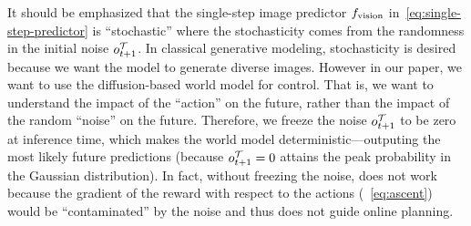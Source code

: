 \begin{remark}
    It should be emphasized that the single-step image predictor $f_{\text{vision}}$ in~\eqref{eq:single-step-predictor} is ``stochastic'' where the stochasticity comes from the randomness in the initial noise $o_{t+1}^{{\cal T}}$. In classical generative modeling, stochasticity is desired because we want the model to generate diverse images. However in our paper, we want to use the diffusion-based world model for control. That is, we want to understand the impact of the ``action'' on the future, rather than the impact of the random ``noise'' on the future. Therefore, we freeze the noise $o_{t+1}^{{\cal T}}$ to be zero at inference time, which makes the world model deterministic---outputing the most likely future predictions (because $o_{t+1}^{{\cal T}}=0$ attains the peak probability in the Gaussian distribution). In fact, without freezing the noise, \gpcopt does not work because the gradient of the reward with respect to the actions (\cf~\eqref{eq:ascent}) would be ``contaminated'' by the noise and thus does not guide online planning.
\end{remark}


